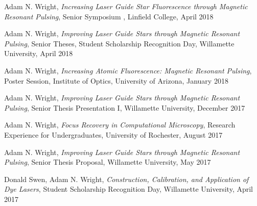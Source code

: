 \documentclass[12pt]{report}
\begin{document}
\begin{description}
\item Adam N. Wright, \textit{Increasing Laser Guide Star Fluorescence through Magnetic Resonant Pulsing}, Senior Symposium , Linfield College, April 2018\\
	
\item Adam N. Wright, \textit{Improving Laser Guide Stars through Magnetic Resonant Pulsing}, Senior Theses, Student Scholarship Recognition Day, Willamette University, April 2018\\

\item Adam N. Wright, \textit{Increasing Atomic Fluorescence: Magnetic Resonant Pulsing}, Poster Session, Institute of Optics, University of Arizona, January 2018\\
	
\item Adam N. Wright, \textit{Improving Laser Guide Stars through Magnetic Resonant Pulsing}, Senior Thesis Presentation I, Willamette University, December 2017\\

\item Adam N. Wright, \textit{Focus Recovery in Computational Microscopy}, Research Experience for Undergraduates, University of Rochester, August 2017\\

\item Adam N. Wright, \textit{Improving Laser Guide Stars through Magnetic Resonant Pulsing}, Senior Thesis Proposal, Willamette University, May 2017\\

\item Donald Swen, Adam N. Wright, \textit{Construction, Calibration, and Application of Dye Lasers}, Student Scholarship Recognition Day, Willamette University, April 2017\\


\end{description}
\end{document}
